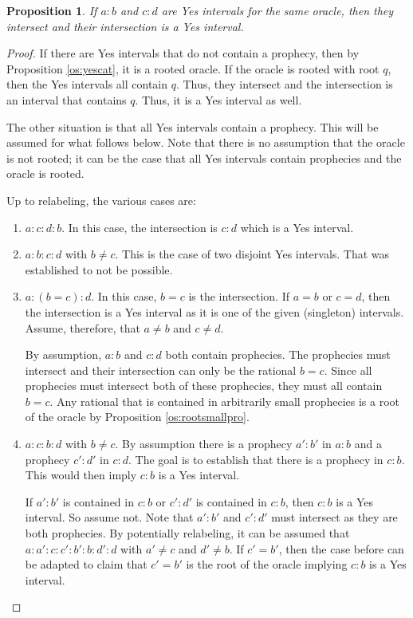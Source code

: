\documentclass[12pt]{article}
\newtheorem{proposition}{Proposition}[section]
\begin{document}
   
\begin{proposition}
    If $ a:b$ and $c:d$ are Yes intervals for the same oracle, then they intersect and their intersection is a Yes interval. 
\end{proposition}

\begin{proof}
    If there are Yes intervals that do not contain a prophecy, then by Proposition \ref{os:yescat}, it is a rooted oracle. If the oracle is rooted with root $q$, then the Yes intervals all contain $q$. Thus, they intersect and the intersection is an interval that contains $q$. Thus, it is a Yes interval as well. 

    The other situation is that all Yes intervals contain a prophecy. This will be assumed for what follows below. Note that there is no assumption that the oracle is not rooted; it can be the case that all Yes intervals contain prophecies and  the oracle is rooted. 

    Up to relabeling, the various cases are: 
    \begin{enumerate}
        \item $a:c:d:b$. In this case, the intersection is $c:d$ which is a Yes interval. 
        \item $a:b:c:d$ with $b \neq c$. This is the case of two disjoint Yes intervals. That was established to not be possible. 


        \item $a:(b=c):d$. In this case, $b=c$ is the intersection.  If $a=b$ or $c=d$, then the intersection is a Yes interval as it is one of the given (singleton) intervals. Assume, therefore, that $a \neq b$ and $c \neq d$. 
        
        By assumption, $a:b$ and $c:d$ both contain prophecies. The prophecies must intersect and their intersection can only be the rational $b=c$. Since all prophecies must intersect both of these prophecies, they must all contain $b=c$. Any rational that is  contained in arbitrarily small prophecies is a root of the oracle by Proposition \ref{os:rootsmallpro}.
        
        \item $a:c:b:d$ with $b \neq c$. By assumption there is a prophecy $a':b'$ in $a:b$ and a prophecy $c':d'$ in $c:d$. The goal is to establish that there is a prophecy in $c:b$. This would then imply $c:b$ is a Yes interval. 
        
        If $a':b'$ is contained in $c:b$ or $c':d'$ is contained in $c:b$, then $c:b$ is a Yes interval. So assume not. Note that $a':b'$ and $c':d'$ must intersect as they are both prophecies. By potentially relabeling, it can be assumed that $a:a':c:c':b':b:d':d$ with $a'\neq c$ and $d' \neq b$. If $c'=b'$, then the case before can be adapted to claim that $c'=b'$ is the root of the oracle implying $c:b$ is a Yes interval. 


\end{enumerate}
\end{proof}
\end{document}
